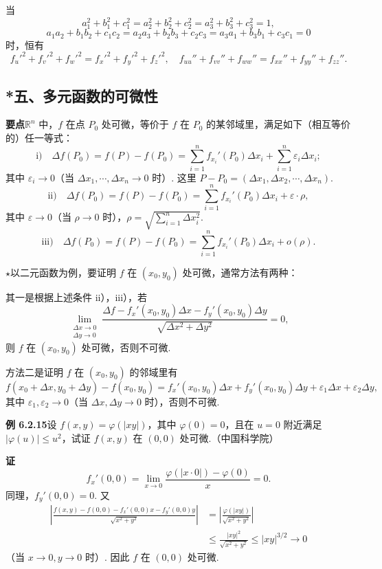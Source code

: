 \documentclass[UTF8, 12pt, fontset=fandol, oneside]{ctexart}
\begin{document}
当
\[
  a_1^2+b_1^2+c_1^2=a_2^2+b_2^2+c_2^2=a_3^2+b_3^2+c_3^2=1,
\]
\[
  a_1a_2+b_1b_2+c_1c_2=a_2a_3+b_2b_3+c_2c_3=a_3a_1+b_3b_1+c_3c_1=0
\]
时，恒有
\[
  f_u'^2+f_v'^2+f_w'^2=f_x'^2+f_y'^2+f_z'^2,\quad
  f_{uu}''+f_{vv}''+f_{ww}''=f_{xx}''+f_{yy}''+f_{zz}''.
\]

\subsection*{*五、多元函数的可微性}

\noindent\textbf{要点}\quad $\mathbb{R}^n$ 中，$f$ 在点 $P_0$ 处可微，等价于 $f$ 在 $P_0$ 的某邻域里，满足如下（相互等价的）任一等式：
\[
  \text{i)}\quad
  \Delta f(P_0)=f(P)-f(P_0)
  =\sum_{i=1}^n f_{x_i}'(P_0)\Delta x_i+\sum_{i=1}^n\varepsilon_i\Delta x_i;
\]
其中 $\varepsilon_i\to0$（当 $\Delta x_1,\cdots,\Delta x_n\to0$ 时）. 这里 $P-P_0=(\Delta x_1,\Delta x_2,\cdots,\Delta x_n)$.
\[
  \text{ii)}\quad
  \Delta f(P_0)=f(P)-f(P_0)=\sum_{i=1}^n f_{x_i}'(P_0)\Delta x_i+\varepsilon\cdot\rho,
\]
其中 $\varepsilon\to0$（当 $\rho\to0$ 时），$\rho=\sqrt{\sum_{i=1}^n\Delta x_i^2}$.
\[
  \text{iii)}\quad
  \Delta f(P_0)=f(P)-f(P_0)=\sum_{i=1}^n f_{x_i}'(P_0)\Delta x_i+o(\rho).
\]

\noindent\textbf{\ensuremath{\star}}\quad 以二元函数为例，要证明 $f$ 在 $(x_0,y_0)$ 处可微，通常方法有两种：

其一是根据上述条件 ii），iii），若
\[
  \lim_{\substack{\Delta x\to0\\ \Delta y\to0}}
  \frac{\Delta f-f_x'(x_0,y_0)\Delta x-f_y'(x_0,y_0)\Delta y}
  {\sqrt{\Delta x^2+\Delta y^2}}=0, \tag{A}
\]
则 $f$ 在 $(x_0,y_0)$ 处可微，否则不可微.

方法二是证明 $f$ 在 $(x_0,y_0)$ 的邻域里有
\[
  f(x_0+\Delta x,y_0+\Delta y)-f(x_0,y_0)
  =f_x'(x_0,y_0)\Delta x+f_y'(x_0,y_0)\Delta y+\varepsilon_1\Delta x+\varepsilon_2\Delta y,
\]
其中 $\varepsilon_1,\varepsilon_2\to0$（当 $\Delta x,\Delta y\to0$ 时），否则不可微.

\noindent\textbf{例 6.2.15}\quad 设 $f(x,y)=\varphi(|xy|)$，其中 $\varphi(0)=0$，且在 $u=0$ 附近满足 $|\varphi(u)|\le u^2$，试证 $f(x,y)$ 在 $(0,0)$ 处可微.（中国科学院）

\noindent\textbf{证}\quad
\[
  f_x'(0,0)=\lim_{x\to0}\frac{\varphi(|x\cdot0|)-\varphi(0)}{x}=0.
\]
同理，$f_y'(0,0)=0$. 又
\[
\begin{aligned}
\left|\frac{f(x,y)-f(0,0)-f_x'(0,0)x-f_y'(0,0)y}{\sqrt{x^2+y^2}}\right|
&=\left|\frac{\varphi(|xy|)}{\sqrt{x^2+y^2}}\right|\\
&\le \frac{|xy|^2}{\sqrt{x^2+y^2}}\le |xy|^{3/2}\to0
\end{aligned}
\]
（当 $x\to0,y\to0$ 时）. 因此 $f$ 在 $(0,0)$ 处可微.
\end{document}
